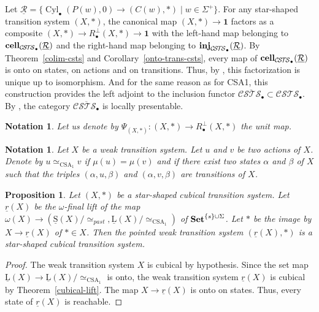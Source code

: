 \documentclass[a4paper,12pt]{amsart}
\newtheorem{prop}[thm]{Proposition}
\newtheorem{nota}[thm]{Notation}
\begin{document}
Let $\underline{\mathcal{R}} = \{\operatorname{{Cyl}}_\bullet(P(w),0) \to (C(w),*)
\mid w\in \Sigma^+\}$. For any star-shaped transition system $(X,*)$,
the canonical map $(X,*) \to \mathbf{1}$ factors as a composite $(X,*)
\to R_\bullet^\perp(X,*) \to \mathbf{1}$ with the left-hand map
belonging to $\operatorname{{{\rm{\mathbf{{cell}}}}}}_{{\mathcal{C\!S\!T\!S}}_\bullet}(\underline{\mathcal{R}})$ and the
right-hand map belonging to
$\operatorname{{{\rm{\mathbf{{inj}}}}}}_{{\mathcal{C\!S\!T\!S}}_\bullet}(\underline{\mathcal{R}})$.  By
Theorem~\ref{colim-csts} and Corollary~\ref{onto-trans-csts}, every
map of $\operatorname{{{\rm{\mathbf{{cell}}}}}}_{{\mathcal{C\!S\!T\!S}}_\bullet}(\underline{\mathcal{R}})$ is onto on
states, on actions and on transitions. Thus, by
\cite[Proposition~A.1]{biscsts1}, this factorization is unique up to
isomorphism. And for the same reason as for CSA1, this construction
provides the left adjoint to the inclusion functor
$\overline{{\mathcal{C\!S\!T\!S}}_\bullet} \subset {\mathcal{C\!S\!T\!S}}_\bullet$. By
\cite[Theorem~1.39]{MR95j:18001}, the category
$\overline{{\mathcal{C\!S\!T\!S}}_\bullet}$ is locally presentable.

\begin{nota} Let us denote by $\Psi_{(X,*)}:(X,*) \to R_\bullet^\perp(X,*)$ the unit
  map. 
\end{nota}

\begin{nota} Let $X$ be a weak transition system. Let $u$ and $v$ be
  two actions of $X$.  Denote by $u\simeq_{\operatorname{CSA}_1} v$ if
  $\mu(u)=\mu(v)$ and if there exist two states $\alpha$ and $\beta$
  of $X$ such that the triples $(\alpha,u,\beta)$ and
  $(\alpha,v,\beta)$ are transitions of $X$.  \end{nota}

\begin{prop} \label{onestep} Let $(X,*)$ be a star-shaped cubical transition
system. Let $\underline{r}(X)$ be the $\omega$-final lift of the map
$\omega(X) \longrightarrow
(\operatorname{\underline{S}}(X)/\!\simeq_{past},\operatorname{\underline{L}}(X)/\!\simeq_{\operatorname{CSA}_1})$ of ${{{\rm{\mathbf{{Set}}}}}}^{\{s\}\cup
  \Sigma}$. Let $*$ be the image by $X\to \underline{r}(X)$ of $*\in
X$. Then the pointed weak transition system $(\underline{r}(X),*)$ is
a star-shaped cubical transition system.  \end{prop}

\begin{proof} The weak transition system $X$ is cubical by hypothesis. Since
the set map $\operatorname{\underline{L}}(X) \to \operatorname{\underline{L}}(X)/\!\simeq_{\operatorname{CSA}_1}$ is onto, the weak
transition system $\underline{r}(X)$ is cubical by
Theorem~\ref{cubical-lift}.  The map $X\to \underline{r}(X)$ is onto
on states. Thus, every state of $\underline{r}(X)$ is reachable.  \end{proof}
\end{document}
